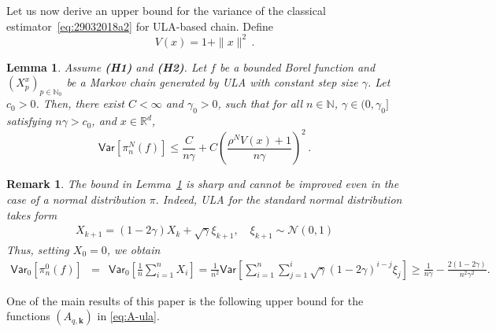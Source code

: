 \documentclass[bj]{imsart}
\def\PVar{\mathsf{Var}}
\def\nset{\mathbb{N}}
\def\rset{\mathbb{R}}
\def\rset{\mathbb{R}}
\newtheorem{lem}[thm]{Lemma}
\newtheorem{remark}[thm]{Remark}
\def\eqsp{\,}
\begin{document}
 Let us now derive an upper bound for the variance of the classical estimator~\eqref{eq:29032018a2} for ULA-based chain. Define
 \begin{equation}
 \label{eq:definition-V}
 V(x) = 1+ \|x\|^2 \,.
 \end{equation}
\begin{lem}
\label{lem:variance}
Assume {\bf (H1)} and {\bf (H2)}.
Let $f$ be a bounded Borel function and $(X^x_{p})_{p \in \nset_0}$ be a Markov chain generated by ULA with constant step size $\gamma$.
Let $c_0>0$. Then, there exist $C < \infty$ and $\gamma_0 > 0$, such that for all $n \in \nset$, $\gamma \in (0,\gamma_0]$ satisfying $n\gamma > c_0$, and $x \in \rset^d$,
\begin{equation}
\label{eq:var-mc}
\PVar\left[\pi_n^N(f)\right]\leq \frac{C}{n\gamma} + C\left(\frac{\rho^NV(x)+1}{n\gamma}\right)^2 \eqsp.
\end{equation}
\end{lem}
\begin{remark}
\label{rem:var-low}
The bound in Lemma~\ref{lem:variance} is sharp and cannot be improved even in the case of a normal distribution $\pi.$
Indeed,  ULA for the standard normal distribution takes form
\begin{eqnarray*}
X_{k+1} = (1-2\gamma)X_k + \sqrt{\gamma}\xi_{k+1},\quad \xi_{k+1} \sim \mathcal{N}(0,1)
\end{eqnarray*}
Thus, setting $X_0 = 0$, we obtain
\begin{eqnarray*}
\PVar_{0} [\pi_n^0(f)] &=& \PVar_{0}\left[\frac{1}{n}\sum\limits_{i=1}^{n}X_i\right]
= \frac{1}{n^2}\PVar\left[\sum\limits_{i=1}^{n}\sum\limits_{j=1}^{i}\sqrt{\gamma}(1-2\gamma)^{i-j}\xi_{j}\right]
\geq  \frac{1}{n\gamma} - \frac{2(1-2\gamma)}{n^2\gamma^2}.
\end{eqnarray*}
\end{remark}
One of the main results of this paper is the following  upper bound for the functions $(A_{q,\mathbf{k}})$ in \eqref{eq:A-ula}.
\end{document}
